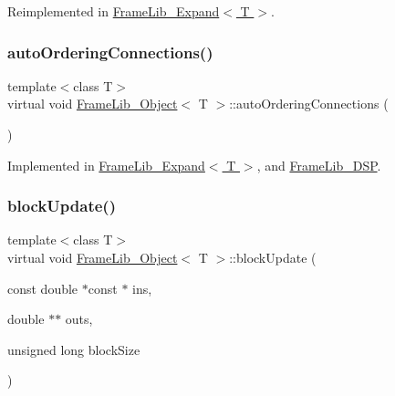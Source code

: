 Reimplemented in \hyperlink{class_frame_lib___expand_ab55544cf81d2ea1c9b53db6124eddc88}{Frame\+Lib\+\_\+\+Expand$<$ T $>$}.

\mbox{\label{class_frame_lib___object_afa5bb93302a641c23b5eac7ab0dfe516}} 
\subsubsection{\texorpdfstring{auto\+Ordering\+Connections()}{autoOrderingConnections()}}
{\footnotesize\ttfamily template$<$class T$>$ \\
virtual void \hyperlink{class_frame_lib___object}{Frame\+Lib\+\_\+\+Object}$<$ T $>$\+::auto\+Ordering\+Connections (\begin{DoxyParamCaption}{ }\end{DoxyParamCaption})\hspace{0.3cm}{\ttfamily [pure virtual]}}



Implemented in \hyperlink{class_frame_lib___expand_affdd2a6ec7ae518770f1fdfea1ce8768}{Frame\+Lib\+\_\+\+Expand$<$ T $>$}, and \hyperlink{class_frame_lib___d_s_p_a6584230fa17c0b76a045fd1ec99f0482}{Frame\+Lib\+\_\+\+D\+SP}.

\mbox{\label{class_frame_lib___object_abd8e6ba645082041000b7a0b67c9b011}} 
\subsubsection{\texorpdfstring{block\+Update()}{blockUpdate()}}
{\footnotesize\ttfamily template$<$class T$>$ \\
virtual void \hyperlink{class_frame_lib___object}{Frame\+Lib\+\_\+\+Object}$<$ T $>$\+::block\+Update (\begin{DoxyParamCaption}\item[{const double $\ast$const $\ast$}]{ins,  }\item[{double $\ast$$\ast$}]{outs,  }\item[{unsigned long}]{block\+Size }\end{DoxyParamCaption})\hspace{0.3cm}{\ttfamily [pure virtual]}}




